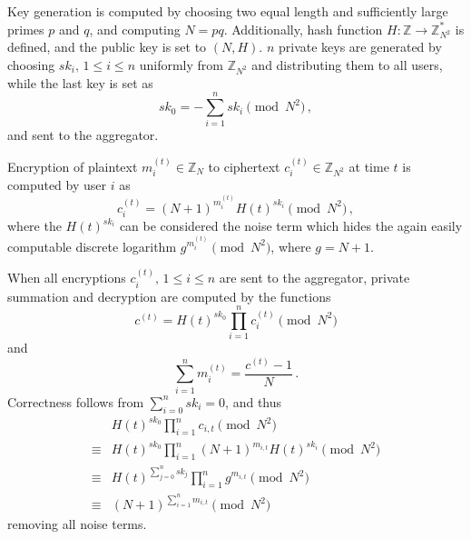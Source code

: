 \documentclass[twocolumn]{autart}
\begin{document}
Key generation is computed by choosing two equal length and sufficiently large primes $p$ and $q$, and computing $N=pq$. Additionally, hash function $H:\mathbb{Z} \rightarrow \mathbb{Z}_{N^2}^*$ is defined, and the public key is set to $(N, H)$. $n$ private keys are generated by choosing $sk_i,\,1\leq i\leq n$ uniformly from $\mathbb{Z}_{N^2}$ and distributing them to all users, while the last key is set as
\begin{equation*}
    sk_0 = -\sum^{n}_{i=1}sk_i \pmod{N^2}\,,
\end{equation*}
and sent to the aggregator.

Encryption of plaintext $m^{(t)}_{i} \in \mathbb{Z}_N$ to ciphertext $c^{(t)}_{i} \in \mathbb{Z}_{N^2}$ at time $t$ is computed by user $i$ as
\begin{equation}
    c^{(t)}_{i} = (N+1)^{m^{(t)}_{i}} H(t)^{sk_i} \pmod{N^2}\,,
\end{equation}
where the $H(t)^{sk_i}$ can be considered the noise term which hides the again easily computable discrete logarithm $g^{m^{(t)}_{i}} \pmod{N^2}$, where $g=N+1$.

When all encryptions $c^{(t)}_{i},\,1\leq i \leq n$ are sent to the aggregator, private summation and decryption are computed by the functions
\begin{equation}
    c^{(t)} = H(t)^{sk_0}\prod^{n}_{i=1}c^{(t)}_{i} \pmod{N^2}
\end{equation}
and
\begin{equation}
    \sum^{n}_{i=1}m^{(t)}_{i} = \frac{c^{(t)}-1}{N}\,. \label{eqn:agg_decryption}
\end{equation}
Correctness follows from $\sum^{n}_{i=0}sk_i = 0$, and thus
\begin{equation*}
    \begin{split}
        &H(t)^{sk_0}\prod^{n}_{i=1}c_{i,t} \pmod{N^2} \\
        \equiv &H(t)^{sk_0}\prod^{n}_{i=1}(N+1)^{m_{i,t}} H(t)^{sk_i} \pmod{N^2} \\
        \equiv &H(t)^{\sum^n_{j=0}sk_j} \prod^{n}_{i=1}g^{m_{i,t}} \pmod{N^2} \\
        \equiv &(N+1)^{\sum^n_{i=1}m_{i,t}} \pmod{N^2}
    \end{split}
\end{equation*}
removing all noise terms.
\end{document}
